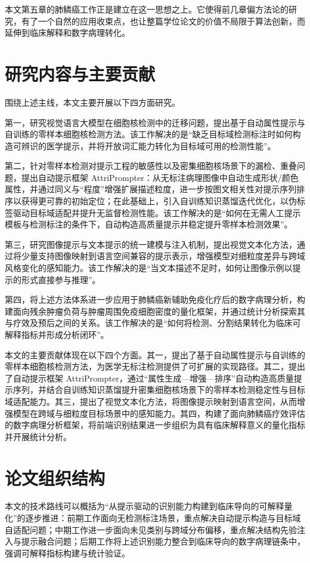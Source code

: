 本文第五章的肺鳞癌工作正是建立在这一思想之上。它使得前几章偏方法论的研究，有了一个自然的应用收束点，也让整篇学位论文的价值不局限于算法创新，而延伸到临床解释和数字病理转化。

\section{研究内容与主要贡献}
围绕上述主线，本文主要开展以下四方面研究。

第一，研究视觉语言大模型在细胞核检测中的迁移问题，提出基于自动属性提示与自训练的零样本细胞核检测方法。该工作解决的是“缺乏目标域检测标注时如何构造可辨识的医学提示，并将开放词汇能力转化为目标域可用的检测性能”。

第二，针对零样本检测对提示工程的敏感性以及密集细胞核场景下的漏检、重叠问题，提出自动提示框架 AttriPrompter：从无标注病理图像中自动生成形状/颜色属性，并通过同义与“程度”增强扩展描述粒度，进一步按图文相关性对提示序列排序以获得更可靠的初始定位；在此基础上，引入自训练知识蒸馏迭代优化，以伪标签驱动目标域适配并提升无监督检测性能。该工作解决的是“如何在无需人工提示模板与检测标注的条件下，自动构造高质量提示并稳定提升零样本检测效果”。

第三，研究图像提示与文本提示的统一建模与注入机制，提出视觉文本化方法，通过将少量支持图像映射到语言空间兼容的提示表示，增强模型对细粒度差异与跨域风格变化的感知能力。该工作解决的是“当文本描述不足时，如何让图像示例以提示的形式直接参与推理”。

第四，将上述方法体系进一步应用于肺鳞癌新辅助免疫化疗后的数字病理分析，构建面向残余肿瘤负荷与肿瘤周围免疫细胞密度的量化框架，并通过统计分析探索其与疗效及预后之间的关系。该工作解决的是“如何将检测、分割结果转化为临床可解释指标并形成分析闭环”。

本文的主要贡献体现在以下四个方面。其一，提出了基于自动属性提示与自训练的零样本细胞核检测方法，为医学无标注检测提供了可扩展的实现路径。其二，提出了自动提示框架 AttriPrompter，通过“属性生成—增强—排序”自动构造高质量提示序列，并结合自训练知识蒸馏提升密集细胞核场景下的零样本检测稳定性与目标域适配能力。其三，提出了视觉文本化方法，将图像提示映射到语言空间，从而增强模型在跨域与细粒度目标场景中的感知能力。其四，构建了面向肺鳞癌疗效评估的数字病理分析框架，将前端识别结果进一步组织为具有临床解释意义的量化指标并开展统计分析。




\section{论文组织结构}
本文的技术路线可以概括为“从提示驱动的识别能力构建到临床导向的可解释量化”的逐步推进：前期工作面向无检测标注场景，重点解决自动提示构造与目标域自适配问题；中期工作进一步面向未见类别与跨域分布偏移，重点解决结构先验注入与提示融合问题；后期工作将上述识别能力整合到临床导向的数字病理链条中，强调可解释指标构建与统计验证。

